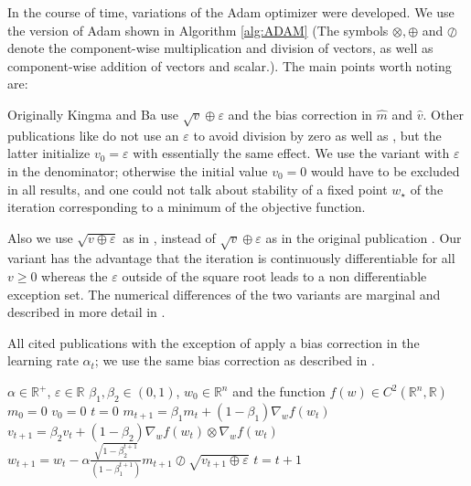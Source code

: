 \documentclass[runningheads]{llncs}
\def\learningrate{\alpha}
\def\weight{w}
\newcommand{\R}{\mathbb{R}} %
\begin{document}
In the course of time, variations of the Adam optimizer were developed.
We use the version of Adam shown in Algorithm \ref{alg:ADAM} (The symbols $\otimes, \oplus$ and $\oslash$ denote the component-wise multiplication and division of vectors, as well as component-wise addition of vectors and scalar.). The main points worth noting are:

Originally Kingma and Ba \cite{Kingma.2014} use $\sqrt{v} \oplus \varepsilon$ and the bias correction in $\hat{m}$ and $\hat{v}$. Other publications like \cite{Reddi.2018, Chen.2018} do not use an $\varepsilon$ to avoid division by zero 
as well as \cite{Zou.2018}, but the latter initialize $v_0 = \varepsilon$ with essentially the same effect. We use the variant with $\varepsilon$ in the denominator; otherwise the initial value $v_0=0$ would have to be excluded in all results, and one could
not talk about stability of a fixed point $\weight_\star$ of the iteration 
corresponding to a minimum of the objective function.

Also we use $\sqrt{v \oplus \varepsilon}$ as in \cite{daSilva.2018, BockWeiss.2019},
instead of $\sqrt{v}\oplus \varepsilon$ as in the original publication \cite{Kingma.2014}. 
Our variant has the advantage that the iteration is continuously differentiable
for all $v\geq0$ whereas the $\varepsilon$ outside of the square root leads to a non differentiable exception set. 
The numerical differences of the two variants are marginal and described in more detail in \cite{BockWeiss.2019}.
 
All cited publications with the exception of \cite{daSilva.2018} 
apply a bias correction in the learning rate $\learningrate_t$; we use the same 
bias correction as described in \cite[Section 2]{Kingma.2014}.

\begin{algorithm}
\caption{Adam Optimization}
\label{alg:ADAM}
\begin{algorithmic}[1]
\REQUIRE $\learningrate \in \R^+$, $\varepsilon \in \R$ $\beta_1, \beta_2 \in (0,1)$, $\weight_0 \in \R^n$ and the function $f(\weight) \in C^2 \left( \R^n, \R \right)$
\STATE $m_0 = 0$
\STATE $v_0 = 0$
\STATE $t = 0$
\WHILE{$\weight$ not converged}
\STATE $m_{t+1} = \beta_1 m_t + (1-\beta_1) \nabla_w f(\weight_t) $ 
\STATE $v_{t+1} = \beta_2 v_t + (1- \beta_2) \nabla_w f(\weight_t) \otimes \nabla_w f(\weight_t)$
\STATE $\weight_{t+1} = \weight_t - \learningrate \frac{\sqrt{1-\beta_2^{t+1}}}{\left( 1-\beta_1^{t+1}\right)} m_{t+1} \oslash \sqrt{v_{t+1} \oplus \varepsilon}$
\STATE $t = t+1$
\ENDWHILE
\end{algorithmic}
\end{algorithm}
\end{document}
